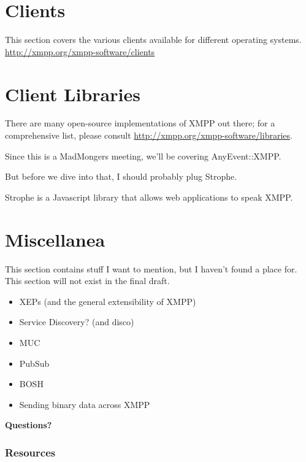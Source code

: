 \documentclass{article}
\begin{document}
\newpage
\part{Clients}

\newpage
This section covers the various clients available for different operating systems.
\url{http://xmpp.org/xmpp-software/clients}

\newpage
\part{Client Libraries}

\newpage
There are many open-source implementations of XMPP out there; for a comprehensive list,
please consult \url{http://xmpp.org/xmpp-software/libraries}.

\newpage
Since this is a MadMongers meeting, we'll be covering AnyEvent::XMPP.

\newpage
But before we dive into that, I should probably plug Strophe.

\newpage
Strophe is a Javascript library that allows web applications to speak XMPP.

\newpage
\part{Miscellanea}

\newpage
This section contains stuff I want to mention, but I haven't found a place for.
This section will not exist in the final draft.

\newpage
\begin{itemize}
\item XEPs (and the general extensibility of XMPP)
\item Service Discovery? (and disco)
\item MUC
\item PubSub
\item BOSH
\item Sending binary data across XMPP
\end{itemize}

\newpage

\vspace*{\fill}
\begin{center}
\textbf{\Huge Questions?}
\end{center}
\vspace*{\fill}

\newpage
\appendix
\section{Resources}
\end{document}
